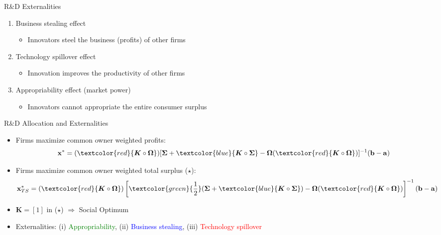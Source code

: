 \documentclass[english,aspectratio=169,handout]{beamer}
\theoremstyle{plain}
\newcommand{\mat}[1]{\bm{#1}}
\newcommand{\vect}[1]{\mathbf{#1}}
\begin{document}
\begin{frame}{R\&D Externalities}
  \label{rd_externalities} %
    \begin{enumerate}
      \item Business stealing effect
      \begin{itemize}
        \item Innovators steel the business (profits) of other firms
      \end{itemize}
      \medskip{}
      \item Technology spillover effect
      \begin{itemize}
        \item Innovation improves the productivity of other firms
      \end{itemize}
      \medskip{}
      \item Appropriability effect (market power)
      \begin{itemize}
        \item Innovators cannot appropriate the entire consumer surplus
      \end{itemize}
    \end{enumerate}
\end{frame}

\begin{frame}{R\&D Allocation and Externalities}
  \label{rd_allocation} %
    \begin{itemize}
      \item Firms maximize common owner weighted profits:
            \[
              \vect{x}^* = (\textcolor{red}{\mat{K}\circ\mat{\Omega}}) [\mat{\Sigma}+\textcolor{blue}{\mat{K} \circ \mat{\Sigma}} - \mat{\Omega}(\textcolor{red}{\mat{K}\circ\mat{\Omega}})]^{-1} (\vect{b} - \vect{a})
            \]
      \item Firms maximize common owner weighted total surplus ($\star$):
            \[
              \vect{x}^*_{TS} = (\textcolor{red}{\mat{K}\circ\mat{\Omega}}) \left[ \textcolor{green}{\frac{1}{2}} (\mat{\Sigma} + \textcolor{blue}{\mat{K} \circ \mat{\Sigma}}) - \mat{\Omega} (\textcolor{red}{\mat{K}\circ\mat{\Omega}}) \right]^{-1} (\vect{b} - \vect{a})
            \]
      \item  $\mat{K}=[1]$ in ($\star$) $\Longrightarrow$ Social Optimum
            \medskip{}
      \item Externalities: (i) \textcolor{green}{Appropriability}, (ii) \textcolor{blue}{Business stealing}, (iii) \textcolor{red}{Technology spillover}
    \end{itemize}
\end{frame}
\end{document}
